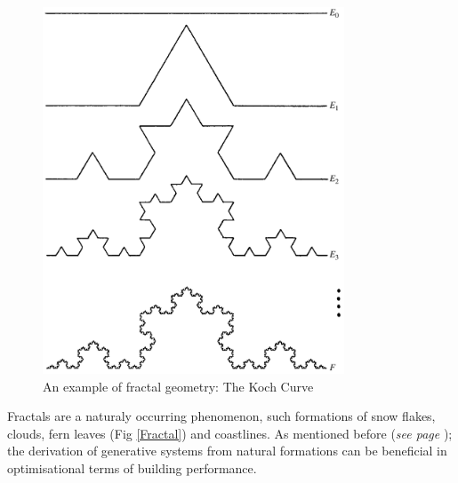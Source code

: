 \begin{figure}[htbp]
\centering
\includegraphics[width=0.8\textwidth]{./Images/9-FractalGeom}
\caption[The Koch Curve]{An example of fractal geometry: The Koch Curve \cite{falconer03}}
\label{KochCurve}
\end{figure}

Fractals are a naturaly occurring phenomenon, such formations of snow flakes, clouds, fern leaves (Fig \ref{Fractal}) and coastlines. As mentioned before (\emph{see page} \pageref{NaturalOpt}); the derivation of generative systems from natural formations can be beneficial in optimisational terms of building performance.

